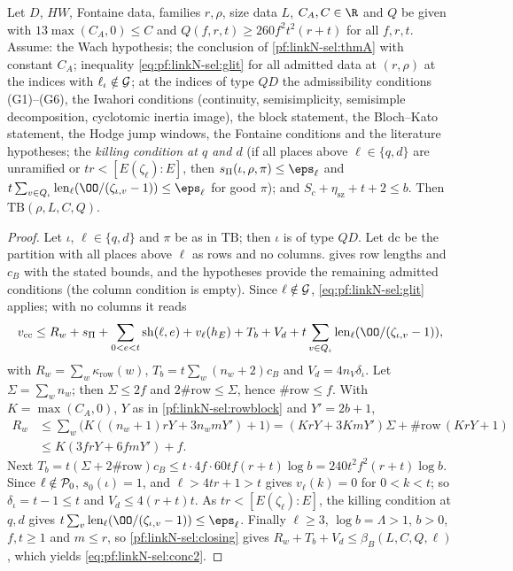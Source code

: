 \begin{theorem}\label{pf:linkN-sel:thmBadm}
Let $D$, $HW$, Fontaine data, families $r,\rho$, size data $L$, $C_A,C\in\R$ and $Q$ be given with $13\max(C_A,0)\le C$ and
$Q(f,r,t)\ge260f^2t^2(r+t)$ for all $f,r,t$. Assume: the Wach hypothesis; the conclusion of \cref{pf:linkN-sel:thmA} with constant $C_A$;
inequality \eqref{eq:pf:linkN-sel:glit} for all admitted data at $(r,\rho)$ at the indices with $\ell_\iota\notin\mathcal G$; at the indices of
type $QD$ the admissibility conditions (G1)--(G6), the Iwahori conditions (continuity, semisimplicity, semisimple decomposition, cyclotomic
inertia image), the block statement, the Bloch--Kato statement, the Hodge jump windows, the Fontaine conditions and the literature
hypotheses; the \emph{killing condition at $q$ and $d$} (if all places above $\ell\in\{q,d\}$ are unramified or $tr<[E(\zeta_\ell):E]$, then
$\linkNselsP(\iota,\rho,\pi)\le\eps_\ell$ and $t\sum_{v\in Q_\iota}\linkNsellen(\OO/(\zeta_{\iota,v}-1))\le\eps_\ell$ for good $\pi$); and
$S_c+\eta_{\mathrm{sz}}+t+2\le b$. Then $\mathrm{TB}(\rho,L,C,Q)$.
\end{theorem}

\begin{proof}
Let $\iota$, $\ell\in\{q,d\}$ and $\pi$ be as in $\mathrm{TB}$; then $\iota$ is of type $QD$. Let $\mathrm{dc}$ be the partition with all
places above $\ell$ as rows and no columns.  gives row lengths and $c_B$ with the stated bounds, and the
hypotheses provide the remaining admitted conditions (the column condition is empty). Since $\ell\notin\mathcal G$,
\eqref{eq:pf:linkN-sel:glit} applies; with no columns it reads
\[
\linkNselvcc\le R_w+\linkNselsP+\sum_{0<e<t}\mathrm{sh}(\ell,e)+v_\ell(h_E)+T_b+V_d+t\sum_{v\in Q_\iota}\linkNsellen(\OO/(\zeta_{\iota,v}-1)),
\]
with $R_w=\sum_{w}\kappa_{\mathrm{row}}(w)$, $T_b=t\sum_w(n_w+2)c_B$ and $V_d=4n_V\delta_\iota$. Let $\Sigma=\sum_wn_w$; then $\Sigma\le2f$ and
$2\#\mathrm{row}\le\Sigma$, hence $\#\mathrm{row}\le f$. With $K=\max(C_A,0)$, $Y$ as in \cref{pf:linkN-sel:rowblock} and $Y'=2b+1$,
\begin{align*}
R_w&\le\sum_w\bigl(K((n_w+1)rY+3n_wmY')+1\bigr)=(KrY+3KmY')\Sigma+\#\mathrm{row}\,(KrY+1)\\
&\le K(3frY+6fmY')+f.
\end{align*}
Next $T_b=t(\Sigma+2\#\mathrm{row})c_B\le t\cdot4f\cdot60tf(r+t)\log b=240t^2f^2(r+t)\log b$. Since $\ell\notin\mathcal P_0$, $s_0(\iota)=1$,
and $\ell>4tr+1>t$ gives $v_\ell(k)=0$ for $0<k<t$; so $\delta_\iota=t-1\le t$ and $V_d\le4(r+t)t$. As $tr<[E(\zeta_\ell):E]$, the killing
condition at $q,d$ gives $t\sum_v\linkNsellen(\OO/(\zeta_{\iota,v}-1))\le\eps_\ell$. Finally $\ell\ge3$, $\log b=\Lambda>1$, $b>0$, $f,t\ge1$
and $m\le r$, so \cref{pf:linkN-sel:closing} gives $R_w+T_b+V_d\le\beta_B(L,C,Q,\ell)$, which yields \eqref{eq:pf:linkN-sel:conc2}.
\end{proof}


